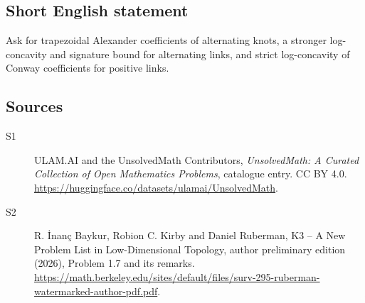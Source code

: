 \documentclass[11pt]{article}
\begin{document}
\subsection{Short English statement}
Ask for trapezoidal Alexander coefficients of alternating knots, a stronger log-concavity and signature bound for alternating links, and strict log-concavity of Conway coefficients for positive links.
\subsection{Sources}
\begin{description}
\item[\hypertarget{source:statement:1}{S1}] ULAM.AI and the UnsolvedMath Contributors, \emph{UnsolvedMath: A Curated Collection of Open Mathematics Problems}, catalogue entry. CC BY 4.0. \url{https://huggingface.co/datasets/ulamai/UnsolvedMath}.
\item[\hypertarget{source:statement:2}{S2}] R. \.{I}nan\c{c} Baykur, Robion C. Kirby and Daniel Ruberman, K3 -- A New Problem List in Low-Dimensional Topology, author preliminary edition (2026), Problem 1.7 and its remarks. \url{https://math.berkeley.edu/sites/default/files/surv-295-ruberman-watermarked-author-pdf.pdf}.
\end{description}
\label{end:statement}
\end{document}
